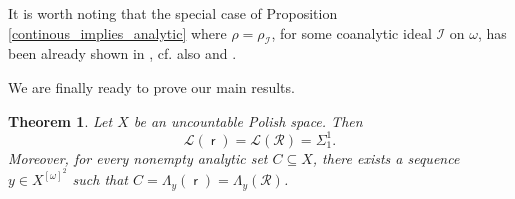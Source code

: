 \documentclass{amsart}
\theoremstyle{plain}
\newtheorem{thm}{Theorem}[section]
\theoremstyle{definition}
\theoremstyle{remark}
\newcommand{\cI}{\mathcal{I}}
\newcommand{\I}{\cI}
\DeclareMathOperator{\rr}{\mathsf{r}}
\begin{document}
It is worth noting that the special case of Proposition \ref{continous_implies_analytic} where $\rho=\rho_\I$, for some coanalytic ideal $\I$ on $\omega$, has been already shown in \cite[Proposition 4.1]{MR3883171}, cf. also \cite[Theorem 4.1]{MR4505549} and \cite[Theorem 3.3]{MSP24}.

We are finally ready to prove our main results.
\begin{thm}\label{thm:mainRamsey}
Let $X$ be an uncountable Polish space. Then 
\begin{equation*}
\mathscr{L}(\rr)=\mathscr{L}(\mathcal{R})=\Sigma_1^1. 
\end{equation*}
Moreover, 
for every nonempty analytic set $C\subseteq X$,  there exists a sequence $y\in X^{[\omega]^2}$ such that $C=\Lambda_y(\rr)=\Lambda_y(\mathcal{R})$. 
\end{thm}
\end{document}
